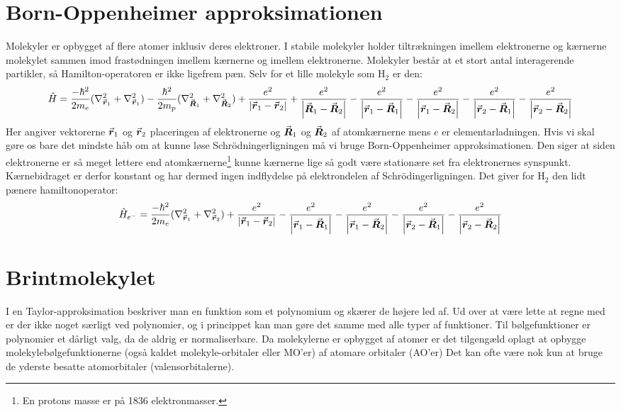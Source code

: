 \documentclass[../../Atom-ogMolekylefysik.tex]{subfiles}
\begin{document}
\section{Born-Oppenheimer approksimationen}
Molekyler er opbygget af flere atomer inklusiv deres elektroner. I stabile molekyler holder tiltrækningen imellem elektronerne og kærnerne molekylet sammen imod frastødningen imellem kærnerne og imellem elektronerne. Molekyler består at et stort antal interagerende partikler, så Hamilton-operatoren er ikke ligefrem pæn. Selv for et lille molekyle som H$_2$ er den:
\begin{equation*}
    \hat H = \frac{-\hbar^2}{2m_e}(\nabla_{{\vec{\boldsymbol{r}}}_1}^2+\nabla_{{\vec{\boldsymbol{r}}}_1}^2)-\frac{\hbar^2}{2m_p}(\nabla_{{\vec{\boldsymbol{R}}}_1}^2+\nabla_{{\vec{\boldsymbol{R}}}_2}^2)+\frac{e^2}{\left| {\vec{\boldsymbol{r}}}_1-{\vec{\boldsymbol{r}}}_2 \right|}+\frac{e^2}{\left| {\vec{\boldsymbol{R}}}_1-{\vec{\boldsymbol{R}}}_2 \right|}-\frac{e^2}{\left| {\vec{\boldsymbol{r}}}_1-{\vec{\boldsymbol{R}}}_1 \right|}-\frac{e^2}{\left| {\vec{\boldsymbol{r}}}_1-{\vec{\boldsymbol{R}}}_2 \right|}-\frac{e^2}{\left| {\vec{\boldsymbol{r}}}_2-{\vec{\boldsymbol{R}}}_1 \right|}-\frac{e^2}{\left| {\vec{\boldsymbol{r}}}_2-{\vec{\boldsymbol{R}}}_2 \right|}
\end{equation*}
Her angiver vektorerne ${\vec{\boldsymbol{r}}}_1$ og ${\vec{\boldsymbol{r}}}_2$ placeringen af elektronerne og ${\vec{\boldsymbol{R}}}_1$ og ${\vec{\boldsymbol{R}}}_2$ af atomkærnerne mens $e$ er elementarladningen.
Hvis vi skal gøre os bare det mindste håb om at kunne løse Schrödningerligningen må vi bruge Born-Oppenheimer approksimationen. Den siger at siden elektronerne er så meget lettere end atomkærnerne\footnote{En protons masse er på 1836 elektronmasser.} kunne kærnerne lige så godt være stationære set fra elektronernes synspunkt. Kærnebidraget er derfor konstant og har dermed ingen indflydelse på elektrondelen af Schrödingerligningen. Det giver for H$_2$ den lidt pænere hamiltonoperator:
\begin{equation}
    \hat H_{e^-} = \frac{-\hbar^2}{2m_e}(\nabla_{{\vec{\boldsymbol{r}}}_1}^2+\nabla_{{\vec{\boldsymbol{r}}}_2}^2)+\frac{e^2}{\left| {\vec{\boldsymbol{r}}}_1-{\vec{\boldsymbol{r}}}_2 \right|}-\frac{e^2}{\left| {\vec{\boldsymbol{r}}}_1-{\vec{\boldsymbol{R}}}_1 \right|}-\frac{e^2}{\left| {\vec{\boldsymbol{r}}}_1-{\vec{\boldsymbol{R}}}_2 \right|}-\frac{e^2}{\left| {\vec{\boldsymbol{r}}}_2-{\vec{\boldsymbol{R}}}_1 \right|}-\frac{e^2}{\left| {\vec{\boldsymbol{r}}}_2-{\vec{\boldsymbol{R}}}_2 \right|}
\end{equation}
\section{Brintmolekylet}

I en Taylor-approksimation beskriver man en funktion som et polynomium og skærer de højere led af.
Ud over at være lette at regne med er der ikke noget særligt ved polynomier, og i princippet kan man
gøre det samme med alle typer af funktioner. Til bølgefunktioner er polynomier et dårligt valg, da de
aldrig er normaliserbare. Da molekylerne er opbygget af atomer er det tilgengæld oplagt at opbygge
molekylebølgefunktionerne (også kaldet molekyle-orbitaler eller MO’er) af atomare orbitaler (AO’er)
Det kan ofte være nok kun at bruge de yderste besatte atomorbitaler (valensorbitalerne).
\end{document}
